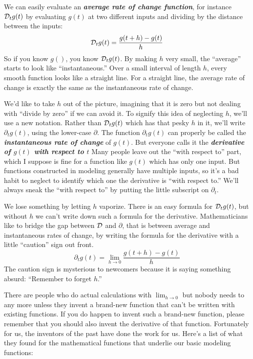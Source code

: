 \documentclass[
]{book}
\begin{document}
We can easily evaluate an \textbf{\emph{average rate of change function}}, for instance \({\cal D}_t g(t)\) by evaluating \(g(t)\) at two different inputs and dividing by the distance between the inputs:
\[{\cal D}_t g(t) = \frac{g(t+h) - g(t)}{h}\]
So if you know \(g()\), you know \({\cal D}_t g(t)\). By making \(h\) very small, the ``average'' starts to look like ``instantaneous.'' Over a small interval of length \(h\), every smooth function looks like a straight line. For a straight line, the average rate of change is exactly the same as the instantaneous rate of change.

We'd like to take \(h\) out of the picture, imagining that it is zero but not dealing with ``divide by zero'' if we can avoid it. To signify this idea of neglecting \(h\), we'll use a new notation. Rather than \({\cal D}_t g(t)\) which has that pesky \(h\) in it, we'll write \(\partial_t g(t)\), using the lower-case \(\partial\). The function \(\partial_t g(t)\) can properly be called the \textbf{\emph{instantaneous rate of change}} of \(g(t)\). But everyone calls it the \textbf{\emph{derivative of \(g(t)\) with respect to \(t\)}} Many people leave out the ``with respect to'' part, which I suppose is fine for a function like \(g(t)\) which has only one input. But functions constructed in modeling generally have multiple inputs, so it's a bad habit to neglect to identify which one the derivative is ``with respect to.'' We'll always sneak the ``with respect to'' by putting the little subscript on \(\partial_t\).

We lose something by letting \(h\) vaporize. There is an easy formula for \({\cal D}_t g(t)\), but without \(h\) we can't write down such a formula for the derivative. Mathematicians like to bridge the gap between \({\cal D}\) and \(\partial\), that is between average and instantaneous rates of change, by writing the formula for the derivative with a little ``caution'' sign out front.
\[\partial_t g(t) = \lim_{h\rightarrow 0} \frac{g(t+h) - g(t)}{h}\]
The caution sign is mysterious to newcomers because it is saying something absurd: ``Remember to forget \(h\).''

There are people who do actual calculations with \(\lim_{h\rightarrow 0}\) but nobody needs to any more unless they invent a brand-new function that can't be written with existing functions. If you do happen to invent such a brand-new function, please remember that you should also invent the derivative of that function. Fortunately for us, the inventors of the past have done the work for us. Here's a list of what they found for the mathematical functions that underlie our basic modeling functions:
\end{document}
